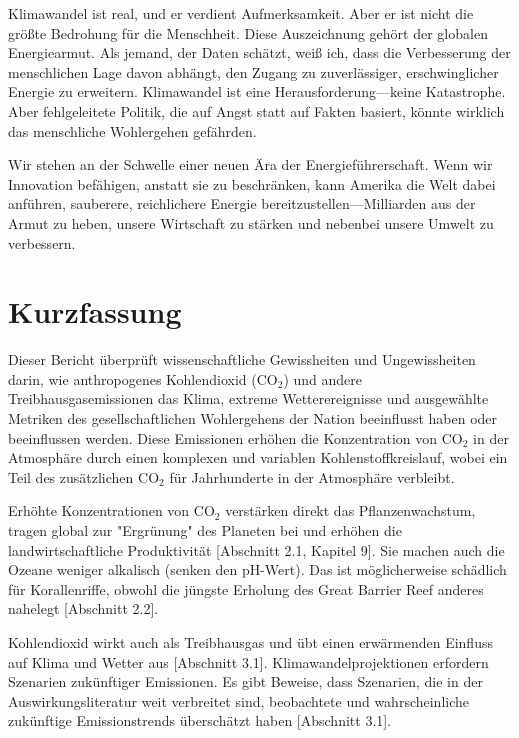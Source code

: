 \documentclass[12pt,paper=a4,DIV=12,parskip=never,chapterprefix=false,headings=standardclasses]{scrreprt}
\numberwithin{figure}{chapter}
\begin{document}
Klimawandel ist real, und er verdient Aufmerksamkeit. Aber er ist nicht die größte Bedrohung für die Menschheit. Diese Auszeichnung gehört der globalen Energiearmut. Als jemand, der Daten schätzt, weiß ich, dass die Verbesserung der menschlichen Lage davon abhängt, den Zugang zu zuverlässiger, erschwinglicher Energie zu erweitern. Klimawandel ist eine Herausforderung—keine Katastrophe. Aber fehlgeleitete Politik, die auf Angst statt auf Fakten basiert, könnte wirklich das menschliche Wohlergehen gefährden.

Wir stehen an der Schwelle einer neuen Ära der Energieführerschaft. Wenn wir Innovation befähigen, anstatt sie zu beschränken, kann Amerika die Welt dabei anführen, sauberere, reichlichere Energie bereitzustellen—Milliarden aus der Armut zu heben, unsere Wirtschaft zu stärken und nebenbei unsere Umwelt zu verbessern.

\cleardoublepage
\chapter*{Kurzfassung}
Dieser Bericht überprüft wissenschaftliche Gewissheiten und Ungewissheiten darin, wie anthropogenes Kohlendioxid (CO$_2$) und andere Treibhausgasemissionen das Klima, extreme Wetterereignisse und ausgewählte Metriken des gesellschaftlichen Wohlergehens der Nation beeinflusst haben oder beeinflussen werden. Diese Emissionen erhöhen die Konzentration von CO$_2$ in der Atmosphäre durch einen komplexen und variablen Kohlenstoffkreislauf, wobei ein Teil des zusätzlichen CO$_2$ für Jahrhunderte in der Atmosphäre verbleibt.

Erhöhte Konzentrationen von CO$_2$ verstärken direkt das Pflanzenwachstum, tragen global zur "Ergrünung" des Planeten bei und erhöhen die landwirtschaftliche Produktivität [Abschnitt 2.1, Kapitel 9]. Sie machen auch die Ozeane weniger alkalisch (senken den pH-Wert). Das ist möglicherweise schädlich für Korallenriffe, obwohl die jüngste Erholung des Great Barrier Reef anderes nahelegt [Abschnitt 2.2].

Kohlendioxid wirkt auch als Treibhausgas und übt einen erwärmenden Einfluss auf Klima und Wetter aus [Abschnitt 3.1]. Klimawandelprojektionen erfordern Szenarien zukünftiger Emissionen. Es gibt Beweise, dass Szenarien, die in der Auswirkungsliteratur weit verbreitet sind, beobachtete und wahrscheinliche zukünftige Emissionstrends überschätzt haben [Abschnitt 3.1].
\end{document}
